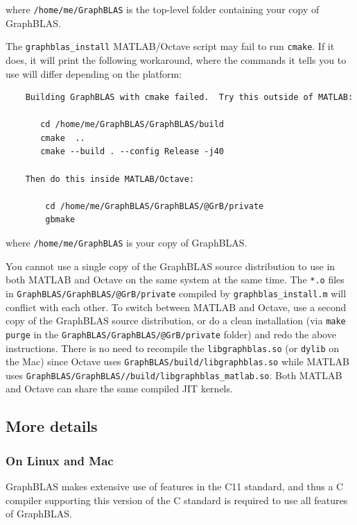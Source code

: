 \noindent
where \verb'/home/me/GraphBLAS' is the top-level folder containing your
copy of GraphBLAS.

The \verb'graphblas_install' MATLAB/Octave script may fail to run \verb'cmake'.
If it does, it will print the following workaround, where the commands it
tells you to use will differ depending on the platform:

    {\small
    \begin{verbatim}
    Building GraphBLAS with cmake failed.  Try this outside of MATLAB:

       cd /home/me/GraphBLAS/GraphBLAS/build
       cmake  ..
       cmake --build . --config Release -j40

    Then do this inside MATLAB/Octave:

        cd /home/me/GraphBLAS/GraphBLAS/@GrB/private
        gbmake \end{verbatim} }

\noindent
where \verb'/home/me/GraphBLAS' is your copy of GraphBLAS.

You cannot use a single copy of the GraphBLAS source distribution to use in
both MATLAB and Octave on the same system at the same time.  The \verb'*.o'
files in \verb'GraphBLAS/GraphBLAS/@GrB/private' compiled by
\verb'graphblas_install.m' will conflict with each other.  To switch between
MATLAB and Octave, use a second copy of the GraphBLAS source distribution, or
do a clean installation (via \verb'make purge' in the
\verb'GraphBLAS/GraphBLAS/@GrB/private' folder) and redo the above
instructions.  There is no need to recompile the \verb'libgraphblas.so' (or
\verb'dylib' on the Mac) since Octave uses
\verb'GraphBLAS/build/libgraphblas.so' while MATLAB  uses
\verb'GraphBLAS/GraphBLAS//build/libgraphblas_matlab.so'.
Both MATLAB and Octave can share the same compiled JIT kernels.

\subsection{More details}

\subsubsection{On Linux and Mac}

GraphBLAS makes extensive use of features in the C11 standard, and thus a
C compiler supporting this version of the C standard is required to use
all features of GraphBLAS.

